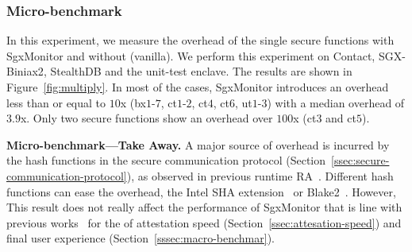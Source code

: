 \subsubsection{Micro-benchmark}
\label{ssec:microbenchmark}

In this experiment, we measure the overhead of the single secure functions
with SgxMonitor and without (\ie vanilla).
We perform this experiment on \textsf{Contact}, \textsf{SGX-Biniax2}, 
\textsf{StealthDB} and the \textsf{unit-test} enclave.
The results are shown in Figure~\ref{fig:multiply}.
In most of the cases, SgxMonitor introduces an overhead less than or equal 
to 
$10$x (bx$1$-$7$, ct$1$-$2$, ct$4$, ct$6$, ut$1$-$3$) with a median overhead of 
$3.9$x.
Only two secure functions show an overhead over $100$x (ct$3$ and ct$5$).

\vspace{0.5cm}
\noindent \textbf{Micro-benchmark---Take Away.}
A major source of overhead is incurred by the hash functions in the secure 
communication protocol (Section~\ref{ssec:secure-communication-protocol}), as 
observed in previous runtime RA~\citep{scarr,abera2016c,aberadiat}.
Different hash functions can ease the overhead, \eg the Intel SHA 
extension~\citep{gulley2013intel} or Blake2~\citep{aumasson2013blake2}.
However, This result does not really affect the performance of SgxMonitor 
that is line with previous works~\citep{scarr} for the of attestation speed 
(Section~\ref{ssec:attesation-speed}) and final user experience 
(Section~\ref{sssec:macro-benchmar}).


